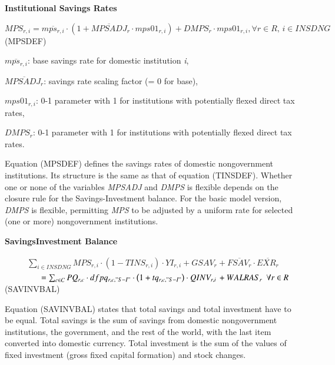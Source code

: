 \documentclass[10pt,a4paper,titlepage,dvipdfmx]{book}
\begin{document}
\begin{flushleft}\textbf{Institutional Savings Rates}\end{flushleft}


\begin{center}$MPS_{r,i}=\overline{mps_{r,i}}\cdot \left(1+\overline{MPSADJ}_{r}\cdot mps01_{r,i}\right)+DMPS_{r}\cdot mps01_{r,i},\forall r\in R,\,i\in INSDNG$ (MPSDEF)
\end{center}

\begin{flushleft}
$\overline{mps_{r,i}}$: base savings rate for domestic institution \textit{i},

$\overline{MPSADJ_{r}}$: savings rate scaling factor (= 0 for base),

$mps01_{r,i}$: 0-1 parameter with 1 for institutions with potentially flexed direct tax rates,

$DMPS_{r}$: 0-1 parameter with 1 for institutions with potentially flexed direct tax rates.
\end{flushleft}

Equation (MPSDEF) defines the savings rates of domestic nongovernment institutions. Its structure is the same as that of equation (TINSDEF). Whether one or none of the variables \textit{MPSADJ} and \textit{DMPS} is flexible depends on the closure rule for the Savings-Investment balance. For the basic model version, \textit{DMPS} is flexible, permitting \textit{MPS} to be adjusted by a uniform rate for selected (one or more) nongovernment institutions.

\begin{flushleft}\textbf{Savings\textendash{}Investment Balance}\end{flushleft}


\begin{center}
\begin{equation*}
\begin{array}{l}
\sum _{i\in INSDNG}MPS_{r,i}\cdot \left(1-TINS_{r,i}\right)\cdot YI_{r,i}+GSAV_{r}+\overline{FSAV_{r}}\cdot \overline{EXR_{r}}
\end{array}
\end{equation*}
$\,\,\,\,\,\,\,\,\,\,\,\,\,\,\,\,\,\,\,\,\,\,\,\,\,\,=\sum _{c\in C}PQ_{r,c}\cdot dfpq_{r,c,"S-I"}\cdot \left(1+tq_{r,c,"S-I"}\right)\cdot QINV_{r,i}\,+WALRAS_{r}\,\,\,\forall r\in R$  (SAVINVBAL)
\end{center}

Equation (SAVINVBAL) states that total savings and total investment have to be equal. Total savings is the sum of savings from domestic nongovernment institutions, the government, and the rest of the world, with the last item converted into domestic currency. Total investment is the sum of the values of fixed investment (gross fixed capital formation) and stock changes.
\end{document}
